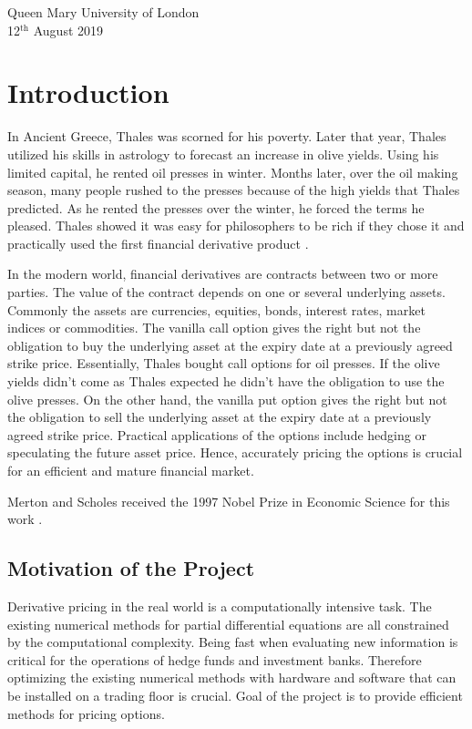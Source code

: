 \documentclass[12pt, oneside]{book}
\theoremstyle{plain}
\theoremstyle{definition}
\begin{document}
\begin{flushright}
Queen Mary University of London\\
12${}^{\text{th}}$ August 2019
\end{flushright}

\tableofcontents

\chapter{Introduction}
In Ancient Greece, Thales was scorned for his poverty. Later that year, Thales utilized his skills in astrology to forecast an increase in olive yields. Using his limited capital, he rented oil presses in winter. Months later, over the oil making season, many people rushed to the presses because of the high yields that Thales predicted. As he rented the presses over the winter, he forced the terms he pleased. Thales showed it was easy for philosophers to be rich if they chose it and practically used the first  financial derivative product \cite{thalesians}. 

In the modern world, financial derivatives are contracts between two or more parties. The value of the contract depends on one or several underlying assets. Commonly the assets are currencies, equities, bonds, interest rates, market indices or commodities. The vanilla call option gives the right but not the obligation to buy the underlying asset at the expiry date at a previously agreed strike price. Essentially, Thales bought call options for oil presses.  If the olive yields didn't come as Thales expected he didn't have the obligation to use the olive presses.  On the other hand, the vanilla put option gives the right but not the obligation to sell the underlying asset at the expiry date at a previously agreed strike price. Practical applications of the options include hedging or speculating the future asset price. Hence, accurately pricing the options is crucial for an efficient and mature financial market.

Merton and Scholes received the 1997 Nobel Prize in Economic Science for this work \cite{merton}. 

\section{Motivation of the Project}
Derivative pricing in the real world is a computationally intensive task. The existing numerical methods for partial differential equations are all constrained by the computational complexity. Being fast when evaluating new information is critical for the operations of hedge funds and investment banks. Therefore optimizing the existing numerical methods with hardware and software that can be installed on a trading floor is crucial. Goal of the project is to provide efficient methods for pricing options.
\end{document}
